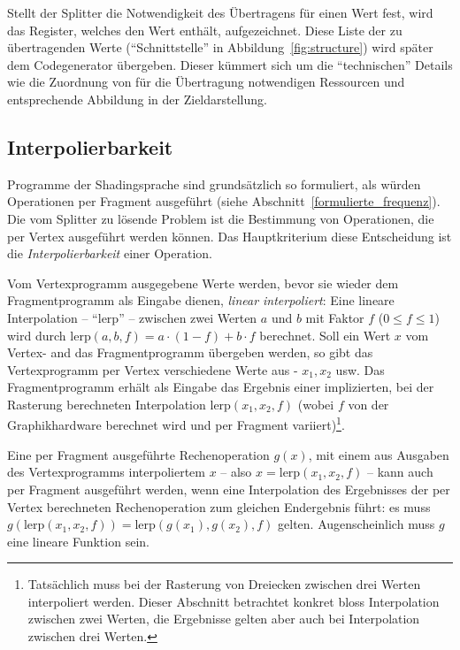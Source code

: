 \documentclass[twoside,a4paper,fleqn,12pt]{book}
\begin{document}
Stellt der Splitter die Notwendigkeit des Übertragens für einen Wert fest, wird das Register, welches den Wert enthält, aufgezeichnet.
Diese Liste der zu übertragenden Werte ("`Schnittstelle"' in Abbildung~\ref{fig:structure}) wird später dem Codegenerator übergeben.
Dieser kümmert sich um die "`technischen"' Details wie die Zuordnung von für die Übertragung notwendigen Ressourcen und %
entsprechende Abbildung in der Zieldarstellung.

\subsection{Interpolierbarkeit}
\label{Interpolierbarkeit}

Programme der Shadingsprache sind grundsätzlich so formuliert, als würden Operationen per Fragment ausgeführt (siehe Abschnitt~\ref{formulierte_frequenz}).
Die vom Splitter zu lösende Problem ist die Bestimmung von Operationen, die per Vertex ausgeführt werden können.
Das Hauptkriterium diese Entscheidung ist die \emph{Interpolierbarkeit} einer Operation.

\newcommand\lerp{\mathrm{lerp}}
Vom Vertexprogramm ausgegebene Werte werden, bevor sie wieder dem Fragmentprogramm als Eingabe dienen, \emph{linear interpoliert}: %
Eine lineare Interpolation -- "`$\lerp$"' -- zwischen zwei Werten $a$ und $b$ mit Faktor $f$ ($0 \le f \le 1$) wird durch $\lerp(a, b, f) = a \cdot (1-f) + b \cdot f$ berechnet.
Soll ein Wert $x$ vom Vertex- and das Fragmentprogramm übergeben werden, so gibt das Vertexprogramm per Vertex verschiedene Werte aus - $x_1, x_2$ usw.
Das Fragmentprogramm erhält als Eingabe das Ergebnis einer implizierten, bei der Rasterung berechneten Interpolation $\lerp(x_1, x_2, f)$ (wobei $f$ von der Graphikhardware berechnet wird
und per Fragment variiert)\footnote{Tatsächlich muss bei der Rasterung von Dreiecken zwischen drei Werten interpoliert werden. Dieser Abschnitt betrachtet konkret
bloss Interpolation zwischen zwei Werten, die Ergebnisse gelten aber auch bei Interpolation zwischen drei Werten.}.

Eine per Fragment ausgeführte Rechenoperation $g(x)$, mit einem aus Ausgaben des Vertexprogramms interpoliertem $x$ -- also $x = \lerp(x_1, x_2, f)$ --
kann auch per Fragment ausgeführt werden, wenn eine Interpolation des Ergebnisses der per Vertex berechneten Rechenoperation zum gleichen Endergebnis führt:
es muss $g(\lerp(x_1, x_2, f)) = \lerp (g(x_1), g(x_2), f)$ gelten. Augenscheinlich muss $g$ eine lineare Funktion sein.
\end{document}
